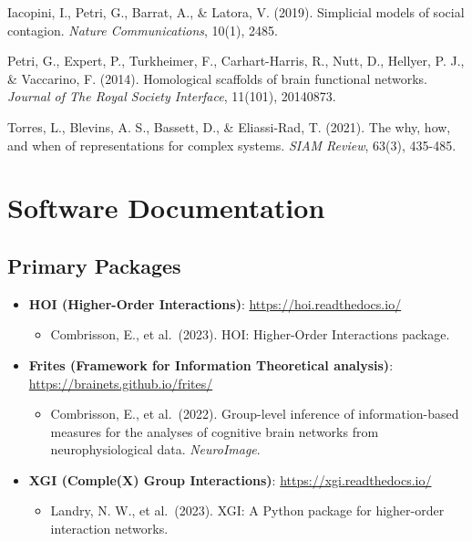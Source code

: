 \documentclass[
  11pt,
  letterpaper,
  oneside,
  openany]{book}
\providecommand{\tightlist}{%
  \setlength{\itemsep}{0pt}\setlength{\parskip}{0pt}}
\begin{document}
Iacopini, I., Petri, G., Barrat, A., \& Latora, V. (2019). Simplicial
models of social contagion. \emph{Nature Communications}, 10(1), 2485.

Petri, G., Expert, P., Turkheimer, F., Carhart-Harris, R., Nutt, D.,
Hellyer, P. J., \& Vaccarino, F. (2014). Homological scaffolds of brain
functional networks. \emph{Journal of The Royal Society Interface},
11(101), 20140873.

Torres, L., Blevins, A. S., Bassett, D., \& Eliassi-Rad, T. (2021). The
why, how, and when of representations for complex systems. \emph{SIAM
Review}, 63(3), 435-485.

\section*{Software Documentation}\label{software-documentation-1}


\subsection*{Primary Packages}\label{primary-packages}

\begin{itemize}
\tightlist
\item
  \textbf{HOI (Higher-Order Interactions)}:
  \url{https://hoi.readthedocs.io/}

  \begin{itemize}
  \tightlist
  \item
    Combrisson, E., et al.~(2023). HOI: Higher-Order Interactions
    package.
  \end{itemize}
\item
  \textbf{Frites (Framework for Information Theoretical analysis)}:
  \url{https://brainets.github.io/frites/}

  \begin{itemize}
  \tightlist
  \item
    Combrisson, E., et al.~(2022). Group-level inference of
    information-based measures for the analyses of cognitive brain
    networks from neurophysiological data. \emph{NeuroImage}.
  \end{itemize}
\item
  \textbf{XGI (Comple(X) Group Interactions)}:
  \url{https://xgi.readthedocs.io/}

  \begin{itemize}
  \tightlist
  \item
    Landry, N. W., et al.~(2023). XGI: A Python package for higher-order
    interaction networks.
  \end{itemize}
\end{itemize}
\end{document}
